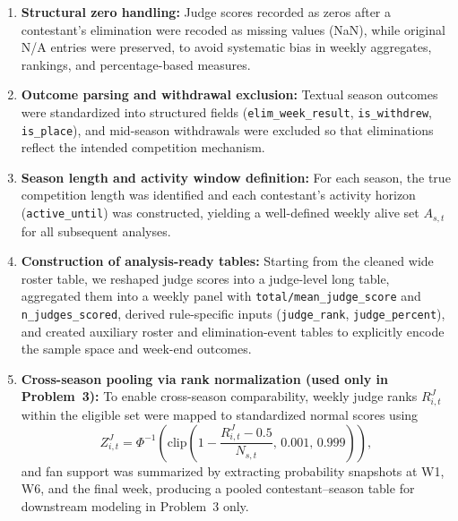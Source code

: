 \documentclass[12pt]{article}
\begin{document}
\begin{enumerate}
	\setlength{\parsep}{0ex} %
	\setlength{\topsep}{2ex} %
	\setlength{\itemsep}{1ex} %
	
	\item \textbf{Structural zero handling:} Judge scores recorded as zeros after a contestant’s elimination were recoded as missing values (NaN), while original N/A entries were preserved, to avoid systematic bias in weekly aggregates, rankings, and percentage-based measures.
	
	\item \textbf{Outcome parsing and withdrawal exclusion:} Textual season outcomes were standardized into structured fields (\texttt{elim\_week\_result}, \texttt{is\_withdrew}, \texttt{is\_place}), and mid-season withdrawals were excluded so that eliminations reflect the intended competition mechanism.
	
	\item \textbf{Season length and activity window definition:} For each season, the true competition length was identified and each contestant’s activity horizon (\texttt{active\_until}) was constructed, yielding a well-defined weekly alive set \(A_{s,t}\) for all subsequent analyses.
	
	\item \textbf{Construction of analysis-ready tables:} Starting from the cleaned wide roster table, we reshaped judge scores into a judge-level long table, aggregated them into a weekly panel with \texttt{total/mean\_judge\_score} and \texttt{n\_judges\_scored}, derived rule-specific inputs (\texttt{judge\_rank}, \texttt{judge\_percent}), and created auxiliary roster and elimination-event tables to explicitly encode the sample space and week-end outcomes.
	
	\item \textbf{Cross-season pooling via rank normalization (used only in Problem~3):} 
	To enable cross-season comparability, weekly judge ranks \(R^J_{i,t}\) within the eligible set were mapped to standardized normal scores using
\begin{equation} 
	Z^J_{i,t}=\Phi^{-1}\!\left(\mathrm{clip}\!\left(1-\frac{R^J_{i,t}-0.5}{N_{s,t}},\,0.001,\,0.999\right)\right),
\end{equation}
	and fan support was summarized by extracting probability snapshots at W1, W6, and the final week, producing a pooled contestant--season table for downstream modeling in Problem~3 only.
	
\end{enumerate}
\end{document}
